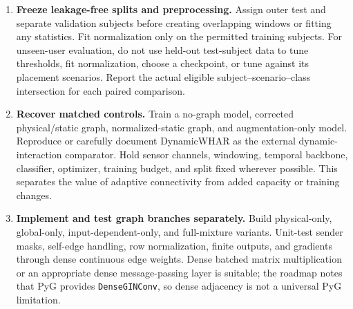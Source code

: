 \documentclass[10pt,a4paper]{article}
\begin{document}
\begin{enumerate}
\textbf{REALDISP schema to preserve:} The nominal sensor order is S1 left calf, S2 left thigh, S3 right calf, S4 right thigh, S5 back, S6 left lower arm, S7 left upper arm, S8 right lower arm, and S9 right upper arm. The documented raw row has two timestamps, nine 13-value IMU blocks, and one activity label (120 columns total). Each IMU block is described as three acceleration, three gyroscope, three magnetic-field, and four quaternion values. The current matched O1/O2 input is proposed as six acceleration/gyroscope channels per sensor, $[T,N,F]=[50,9,6]$, stride 25. Check the downloaded release, units, labels, and the documentation's noted column-range inconsistencies against sample rows before parsing. Filenames containing ``mutual'' should be mapped to the documented induced-displacement scenario, not treated as a fourth placement condition. Published coverage notes also identify missing self-placement activities for subjects 6 and 13 and very little ideal-placement activity data for subject 7. File totals do not guarantee usable subject--scenario--class coverage.
\item \textbf{Freeze leakage-free splits and preprocessing.} Assign outer test and separate validation subjects before creating overlapping windows or fitting any statistics. Fit normalization only on the permitted training subjects. For unseen-user evaluation, do not use held-out test-subject data to tune thresholds, fit normalization, choose a checkpoint, or tune against its placement scenarios. Report the actual eligible subject--scenario--class intersection for each paired comparison.
\item \textbf{Recover matched controls.} Train a no-graph model, corrected physical/static graph, normalized-static graph, and augmentation-only model. Reproduce or carefully document DynamicWHAR as the external dynamic-interaction comparator. Hold sensor channels, windowing, temporal backbone, classifier, optimizer, training budget, and split fixed wherever possible. This separates the value of adaptive connectivity from added capacity or training changes.
\item \textbf{Implement and test graph branches separately.} Build physical-only, global-only, input-dependent-only, and full-mixture variants. Unit-test sender masks, self-edge handling, row normalization, finite outputs, and gradients through dense continuous edge weights. Dense batched matrix multiplication or an appropriate dense message-passing layer is suitable; the roadmap notes that PyG provides \texttt{DenseGINConv}, so dense adjacency is not a universal PyG limitation.

\end{enumerate}
\end{document}

